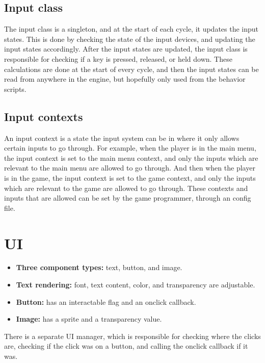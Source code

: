 \documentclass[draft]{article}
\begin{document}
\subsection{Input class}
The input class is a singleton, and at the start of each cycle, it updates the input states.
This is done by checking the state of the input devices, and updating the input states accordingly.
After the input states are updated, the input class is responsible for checking if a key is pressed, released, or held down.
These calculations are done at the start of every cycle, and then the input states can be read from anywhere in the engine, but hopefully only used from the behavior scripts.

\subsection{Input contexts}
An input context is a state the input system can be in where it only allows certain inputs to go through.
For example, when the player is in the main menu, the input context is set to the main menu context, and only the inputs which are relevant to the main menu are allowed to go through.
And then when the player is in the game, the input context is set to the game context, and only the inputs which are relevant to the game are allowed to go through.
These contexts and inputs that are allowed can be set by the game programmer, through an config file.




\section{UI}
\begin{itemize}
  \item \textbf{Three component types:} text, button, and image.
  \item \textbf{Text rendering:} font, text content, color, and transparency are adjustable.
  \item \textbf{Button:} has an interactable flag and an onclick callback.
  \item \textbf{Image:} has a sprite and a transparency value.
\end{itemize}

\noindent
There is a separate UI manager, which is responsible for checking where the clicks are, checking if the click was on a button, and calling the onclick callback if it was.
\end{document}
